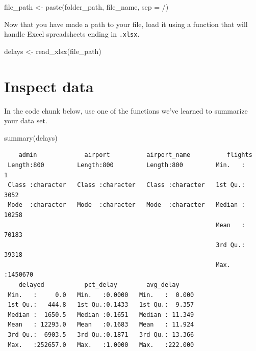 \documentclass[
  letterpaper,
  DIV=11,
  numbers=noendperiod]{scrartcl}
\newenvironment{Shaded}{\begin{snugshade}}{\end{snugshade}}
\newcommand{\AttributeTok}[1]{\textcolor[rgb]{0.40,0.45,0.13}{#1}}
\newcommand{\FunctionTok}[1]{\textcolor[rgb]{0.28,0.35,0.67}{#1}}
\newcommand{\NormalTok}[1]{\textcolor[rgb]{0.00,0.23,0.31}{#1}}
\newcommand{\OtherTok}[1]{\textcolor[rgb]{0.00,0.23,0.31}{#1}}
\newcommand{\StringTok}[1]{\textcolor[rgb]{0.13,0.47,0.30}{#1}}
\begin{document}
\begin{Shaded}
\begin{Highlighting}[]
\NormalTok{file\_path }\OtherTok{\textless{}{-}} \FunctionTok{paste}\NormalTok{(folder\_path, }
\NormalTok{                   file\_name, }
                   \AttributeTok{sep =} \StringTok{\textquotesingle{}/\textquotesingle{}}\NormalTok{)}
\end{Highlighting}
\end{Shaded}

Now that you have made a path to your file, load it using a function
that will handle Excel spreadsheets ending in \texttt{.xlsx}.

\begin{Shaded}
\begin{Highlighting}[]
\NormalTok{delays }\OtherTok{\textless{}{-}} \FunctionTok{read\_xlsx}\NormalTok{(file\_path)}
\end{Highlighting}
\end{Shaded}

\section{Inspect data}\label{inspect-data}

In the code chunk below, use one of the functions we've learned to
summarize your data set.

\begin{Shaded}
\begin{Highlighting}[]
\FunctionTok{summary}\NormalTok{(delays)}
\end{Highlighting}
\end{Shaded}

\begin{verbatim}
    admin             airport          airport_name          flights       
 Length:800         Length:800         Length:800         Min.   :      1  
 Class :character   Class :character   Class :character   1st Qu.:   3052  
 Mode  :character   Mode  :character   Mode  :character   Median :  10258  
                                                          Mean   :  70183  
                                                          3rd Qu.:  39318  
                                                          Max.   :1450670  
    delayed           pct_delay        avg_delay      
 Min.   :     0.0   Min.   :0.0000   Min.   :  0.000  
 1st Qu.:   444.8   1st Qu.:0.1433   1st Qu.:  9.357  
 Median :  1650.5   Median :0.1651   Median : 11.349  
 Mean   : 12293.0   Mean   :0.1683   Mean   : 11.924  
 3rd Qu.:  6903.5   3rd Qu.:0.1871   3rd Qu.: 13.366  
 Max.   :252657.0   Max.   :1.0000   Max.   :222.000  
\end{verbatim}
\end{document}
